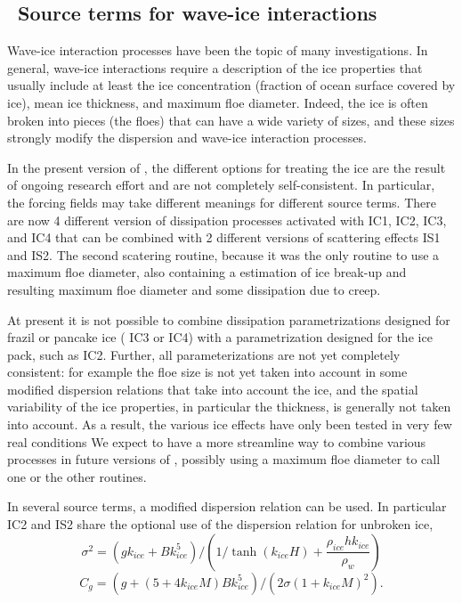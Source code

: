 \vssub
\subsection{~Source terms for wave-ice interactions}
\vsssub

\noindent
Wave-ice interaction processes have been the topic of many investigations. In general, wave-ice interactions require 
a description of the ice properties that usually include at least the ice concentration (fraction of ocean surface covered by ice), 
mean ice thickness, and maximum floe diameter. Indeed, the ice is often broken into pieces (the floes) that can have a wide variety of sizes, 
and these sizes strongly modify the dispersion and wave-ice interaction processes. 

\noindent
In the present version of \ww, the different options 
for treating the ice are the result of ongoing research effort and are not completely self-consistent. In particular, the forcing fields may take 
different meanings for different source terms. There are now 4 different 
version of dissipation processes activated with {\code IC1}, {\code IC2},  {\code IC3}, and {\code IC4} that can be combined with 2 
different versions of scattering effects  {\code IS1} and {\code IS2}. The second scatering routine, because it was the only routine 
to use a maximum floe diameter, also containing a estimation of 
ice break-up and resulting maximum floe diameter and some dissipation due to creep. 

\noindent
At present it is not possible to combine dissipation parametrizations designed for frazil or pancake ice (  {\code IC3} or {\code IC4}) with 
a parametrization designed for the ice pack, such  as {\code IC2}. Further, all parameterizations are not yet completely consistent: 
for example the floe size is not yet taken into account in some modified dispersion relations that take into account the ice, and 
the spatial variability of the ice properties, in particular the thickness, is generally not taken into account. As a result, 
the various ice effects have only been tested in very  few real conditions \citep[e.g.][]{art:Aea16}
We expect to have a more streamline way to combine various processes in future versions of \ww, possibly using 
a maximum floe diameter to call one or the other routines. 

\noindent
In several source terms, a modified dispersion relation can be used. In particular {\code IC2} and {\code IS2} share 
the optional use of the \cite{art:LMC88} dispersion relation for unbroken ice, 
\begin{equation}
\sigma^2 =  \left(gk_{ice} + B k_{ice}^5\right)  / \left(1/\tanh ( k_{ice}H) +\frac{\rho_{ice}  h k_{ice}} {\rho_{w} }\right)
\end{equation}
\begin{equation}
C_g =  (g+(5 + 4 k_{ice} M)Bk_{ice}^5)/(2\sigma(1+k_{ice}M)^2).
\end{equation}

